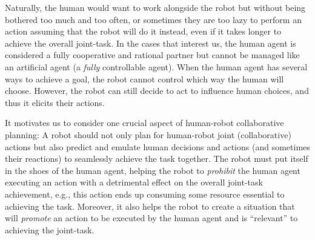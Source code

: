 \documentclass[letterpaper]{article} %
\begin{document}
Naturally, the human would want to work alongside the robot but without being bothered too much and too often, or sometimes they are too lazy to perform an action assuming that the robot will do it instead, even if it takes longer to achieve the overall joint-task. 
In the cases that interest us, the human agent is considered a fully cooperative and rational partner but cannot be managed like an artificial agent (a \textit{fully} controllable agent). When the human agent has several ways to achieve a goal, the robot cannot control which way the human will choose.  However, the robot can still decide to act to influence human choices, and thus it elicits their actions. 

It motivates us to consider one crucial aspect of human-robot collaborative planning: A robot should not only plan for human-robot joint (collaborative) actions but also predict and emulate human decisions and actions (and sometimes their reactions) to seamlessly achieve the task together. 
The robot must put itself in the shoes of the human agent, helping the robot to \textit{prohibit} the human agent executing an action with a detrimental effect on the overall joint-task achievement, e.g., this action ends up consuming some resource essential to achieving the task. 
Moreover, it also helps the robot to create a situation that will \textit{promote} an action to be executed by the human agent and is ``relevant'' to achieving the joint-task.       
\end{document}
